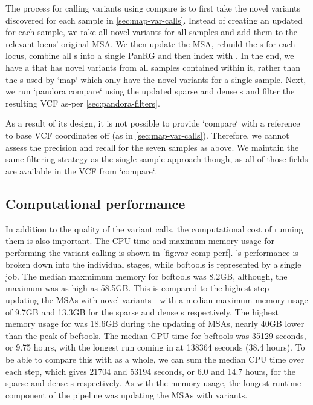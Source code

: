 The process for calling variants using compare is to first take the novel variants discovered for each sample in \autoref{sec:map-var-calls}. Instead of creating an updated \prg{} for each sample, we take all novel variants for all samples and add them to the relevant locus' original MSA. We then update the MSA, rebuild the \prg{}s for each locus, combine all \prg{}s into a single PanRG and then index with \pandora{}. In the end, we have a \prg{} that has novel variants from all samples contained within it, rather than the \prg{}s used by `map` which only have the novel variants for a single sample.
Next, we run `pandora compare` using the updated sparse and dense \prg{}s and filter the resulting VCF as-per \autoref{sec:pandora-filters}.

As a result of its design, it is not possible to provide `compare` with a reference to base VCF coordinates off (as in \autoref{sec:map-var-calls}). Therefore, we cannot assess the precision and recall for the seven samples as above. We maintain the same filtering strategy as the single-sample approach though, as all of those fields are available in the VCF from `compare`.

\subsection{Computational performance}
\label{sec:var-call-comp-perf}

In addition to the quality of the variant calls, the computational cost of running them is also important. The CPU time and maximum memory usage for performing the \ont{} variant calling is shown in \autoref{fig:var-comp-perf}. \pandora{}'s performance is broken down into the individual stages, while bcftools is represented by a single job. The median maxmimum memory for bcftools was 8.2GB, although, the maximum was as high as 58.5GB. This is compared to the highest \pandora{} step - updating the MSAs with novel variants - with a median maximum memory usage of 9.7GB and 13.3GB for the sparse and dense \prg{}s respectively. The highest memory usage for \pandora{} was 18.6GB during the updating of MSAs, nearly 40GB lower than the peak of bcftools. The median CPU time for bcftools was 35129 seconds, or 9.75 hours, with the longest run coming in at 138364 seconds (38.4 hours). To be able to compare this with \pandora{} as a whole, we can sum the median CPU time over each step, which gives 21704 and 53194 seconds, or 6.0 and 14.7 hours, for the sparse and dense \prg{}s respectively. As with the memory usage, the longest runtime component of the \pandora{} pipeline was updating the MSAs with \denovo{} variants.

